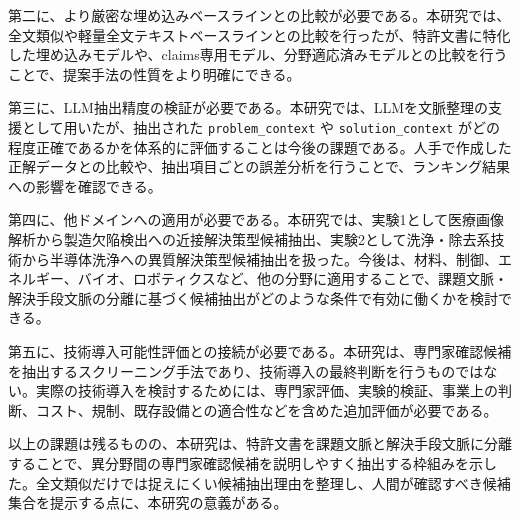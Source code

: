 第二に、より厳密な埋め込みベースラインとの比較が必要である。本研究では、全文類似や軽量全文テキストベースラインとの比較を行ったが、特許文書に特化した埋め込みモデルや、claims専用モデル、分野適応済みモデルとの比較を行うことで、提案手法の性質をより明確にできる。

第三に、LLM抽出精度の検証が必要である。本研究では、LLMを文脈整理の支援として用いたが、抽出された \texttt{problem\_context} や \texttt{solution\_context} がどの程度正確であるかを体系的に評価することは今後の課題である。人手で作成した正解データとの比較や、抽出項目ごとの誤差分析を行うことで、ランキング結果への影響を確認できる。

第四に、他ドメインへの適用が必要である。本研究では、実験1として医療画像解析から製造欠陥検出への近接解決策型候補抽出、実験2として洗浄・除去系技術から半導体洗浄への異質解決策型候補抽出を扱った。今後は、材料、制御、エネルギー、バイオ、ロボティクスなど、他の分野に適用することで、課題文脈・解決手段文脈の分離に基づく候補抽出がどのような条件で有効に働くかを検討できる。

第五に、技術導入可能性評価との接続が必要である。本研究は、専門家確認候補を抽出するスクリーニング手法であり、技術導入の最終判断を行うものではない。実際の技術導入を検討するためには、専門家評価、実験的検証、事業上の判断、コスト、規制、既存設備との適合性などを含めた追加評価が必要である。

以上の課題は残るものの、本研究は、特許文書を課題文脈と解決手段文脈に分離することで、異分野間の専門家確認候補を説明しやすく抽出する枠組みを示した。全文類似だけでは捉えにくい候補抽出理由を整理し、人間が確認すべき候補集合を提示する点に、本研究の意義がある。
